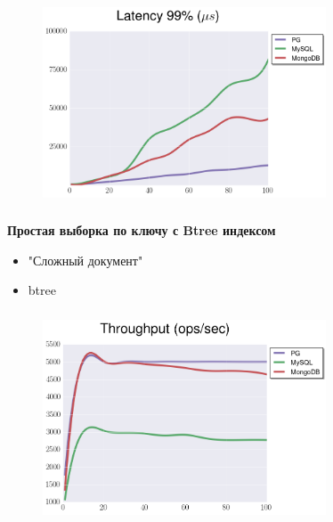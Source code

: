 \documentclass[usenames,dvipsnames, 18pt, compress, aspectratio=169]{beamer}
\begin{document}
\begin{frame}
    \frametitle{}
    \begin{center}
    \begin{figure}
        \includegraphics[width=0.75\textwidth,center]{benchmarks/select_btree_latency.png}
    \end{figure}
    \end{center}
\end{frame}

\begin{frame}
    \frametitle{}
    \begin{center}
        \textbf{Простая выборка по ключу с Btree индексом}
        \begin{itemize}[label={}]
            \item "Сложный документ"
            \item btree
        \end{itemize}
    \end{center}
\end{frame}

\begin{frame}
    \frametitle{}
    \begin{center}
    \begin{figure}
        \includegraphics[width=0.75\textwidth,center]{benchmarks/select_complex_btree_throughput.png}
    \end{figure}
    \end{center}
\end{frame}
\end{document}
